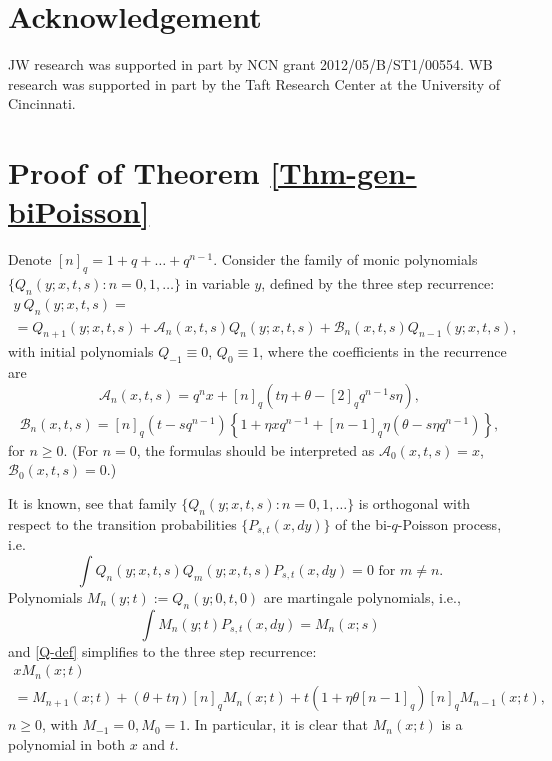 \documentclass{amsart}
\theoremstyle{definition}
\theoremstyle{remark}
\theoremstyle{remark}
\theoremstyle{definition}
\numberwithin{equation}{section}
\begin{document}
\section*{Acknowledgement}  JW research was supported in part by NCN grant 2012/05/B/ST1/00554. WB research was supported in part by the Taft Research Center at the University of Cincinnati.

\appendix

                                      
\section{Proof of Theorem \ref{Thm-gen-biPoisson}}\label{S:PofThm}
Denote ${\left[{n}\right]_{q}}=1+q+\dots+q^{n-1}$.
Consider the family of monic polynomials $\{Q_n{(y;x,t,s)}: n=0,1,\dots\}$ in variable $y$,
defined by the three step recurrence:
\begin{multline}\label{Q-def}
y\ Q_n{(y;x,t,s)}=\\  =Q_{n+1}{(y;x,t,s)}+{{\mathcal A}}_n(x,t,s)Q_n{(y;x,t,s)}+{{\mathcal B}}_n(x,t,s)Q_{n-1}{(y;x,t,s)},
\end{multline}
with initial polynomials $Q_{-1}\equiv0$, $Q_0\equiv1$, where the coefficients in the recurrence are
\begin{equation*}
  {{\mathcal A}}_n(x,t,s)=q^n x+{\left[{n}\right]_{q}}\left(t\eta+\theta-{\left[{2}\right]_{q}}q^{n-1}s\eta\right)\label{AAA},
\end{equation*}
\begin{multline*}
  {{\mathcal B}}_n(x,t,s)={\left[{n}\right]_{q}}\left(t-sq^{n-1}\right)\left\{1+\eta x
q^{n-1}+{\left[{n-1}\right]_{q}}\eta\left(\theta-s\eta q^{n-1}\right)\right\}\label{BBB},
\end{multline*}
for $n\ge0$. (For $n=0$, the formulas should be interpreted as ${{\mathcal A}}_0(x,t,s)=x$, ${{\mathcal B}}_0(x,t,s)=0$.)

It is known, see \cite{Bryc-Matysiak-Wesolowski-04b} that family $\{Q_n{(y;x,t,s)}: n=0,1,\dots\}$ is orthogonal with respect to the transition probabilities
$\{P_{s,t}(x,dy)\}$ of the bi-$q$-Poisson process, i.e.
\begin{equation}
  \label{Q-orth}
  \int Q_n{(y;x,t,s)} Q_m{(y;x,t,s)} P_{s,t}(x,dy) =0 \mbox{ for $m\ne n$}.
\end{equation}
Polynomials $M_n(y;t):=Q_n(y;0,t,0)$ are martingale polynomials, i.e.,
\begin{equation}
  \label{mart}
  \int M_n(y;t)P_{s,t}(x,dy)=M_n(x;s)
\end{equation} and \eqref{Q-def} simplifies to
 the three step recurrence:
\begin{multline}\label{Q-Poisson}
x M_n(x;t) \\=M_{n+1}(x;t)+(\theta+t\eta)[n]_qM_n(x;t)+t(1+\eta\theta[n-1]_q)[n]_qM_{n-1}(x;t),
\end{multline}
$n\geq 0$, with $M_{-1}=0,M_0=1$. In  particular, it is clear that $M_n(x;t)$ is a polynomial in both $x$ and $t$.
\end{document}
